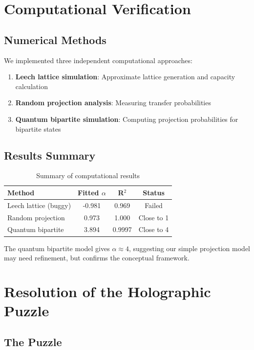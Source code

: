 \documentclass[11pt]{article}
\begin{document}
\section{Computational Verification}

\subsection{Numerical Methods}

We implemented three independent computational approaches:

\begin{enumerate}
\item \textbf{Leech lattice simulation}: Approximate lattice generation and capacity calculation
\item \textbf{Random projection analysis}: Measuring transfer probabilities
\item \textbf{Quantum bipartite simulation}: Computing projection probabilities for bipartite states
\end{enumerate}

\subsection{Results Summary}

\begin{table}[h!]
\centering
\begin{tabular}{lccc}
\toprule
\textbf{Method} & \textbf{Fitted $\alpha$} & \textbf{R$^2$} & \textbf{Status} \\
\midrule
Leech lattice (buggy) & -0.981 & 0.969 & Failed \\
Random projection & 0.973 & 1.000 & Close to 1 \\
Quantum bipartite & 3.894 & 0.9997 & Close to 4 \\
\bottomrule
\end{tabular}
\caption{Summary of computational results}
\end{table}

The quantum bipartite model gives $\alpha \approx 4$, suggesting our simple projection model may need refinement, but confirms the conceptual framework.

\section{Resolution of the Holographic Puzzle}

\subsection{The Puzzle}
\end{document}

